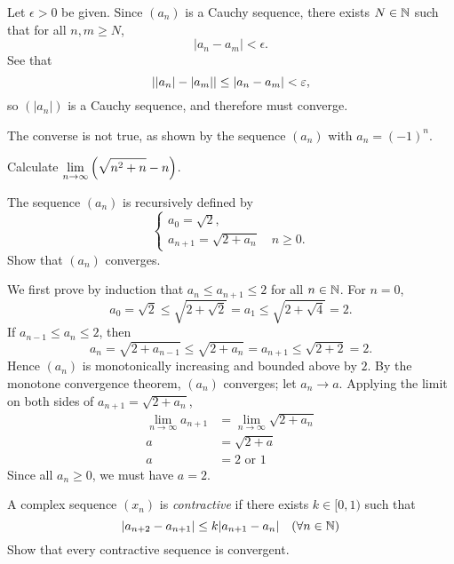 \begin{solution}
Let $\epsilon>0$ be given. Since $(a_n)$ is a Cauchy sequence, there exists $N\in\mathbb N$ such that for all $n,m\ge N$,
\[|a_n-a_m|<\epsilon.\]
See that
\[\left||a_n|-|a_m|\right|\le|a_n-a_m|<\varepsilon,\]
so $(|a_n|)$ is a Cauchy sequence, and therefore must converge.

The converse is not true, as shown by the sequence $(a_n)$ with $a_n=(-1)^n$.
\end{solution}

\begin{exercise}
Calculate $\displaystyle\lim_{n\to\infty}\left(\sqrt{n^2+n}-n\right)$.
\end{exercise}

\begin{solution}

\end{solution}

\begin{exercise}
The sequence $(a_n)$ is recursively defined by
\[\begin{cases}
a_0=\sqrt{2},\\
a_{n+1}=\sqrt{2+a_n}\quad n\ge0.
\end{cases}\]
Show that $(a_n)$ converges.
\end{exercise}

\begin{solution}
We first prove by induction that $a_n\le a_{n+1}\le 2$ for all $n\in\mathbb N$. For $n=0$,
\[a_0=\sqrt{2}\le\sqrt{2+\sqrt{2}}=a_1\le\sqrt{2+\sqrt{4}}=2.\]
If $a_{n-1}\le a_n\le 2$, then
\[a_n=\sqrt{2+a_{n-1}}\le\sqrt{2+a_n}=a_{n+1}\le\sqrt{2+2}=2.\]
Hence $(a_n)$ is monotonically increasing and bounded above by $2$. By the monotone convergence theorem, $(a_n)$ converges; let $a_n\to a$. Applying the limit on both sides of $a_{n+1}=\sqrt{2+a_n}$,
\begin{align*}
\lim_{n\to\infty}a_{n+1}&=\lim_{n\to\infty}\sqrt{2+a_n}\\
a&=\sqrt{2+a}\\
a&=2\text{ or }1
\end{align*}
Since all $a_n\ge0$, we must have $a=2$.
\end{solution}

\begin{exercise}
A complex sequence $(x_n)$ is \emph{contractive} if there exists $k\in[0,1)$ such that
\[|a_{n+2}-a_{n+1}|\le k|a_{n+1}-a_n|\quad(\forall n\in\mathbb N)\]
Show that every contractive sequence is convergent.
\end{exercise}


